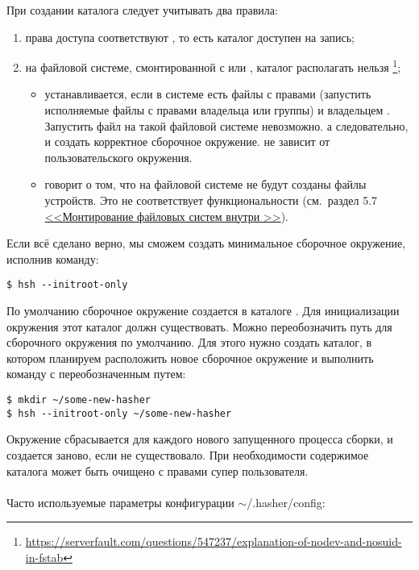 \begin{itemize}
При создании каталога  следует учитывать два правила:
\begin{enumerate}
	\item права доступа соответствуют , то есть каталог доступен на запись;
	\item на файловой системе, смонтированной с  или , каталог располагать нельзя%
\footnote{\href{https://serverfault.com/questions/547237/explanation-of-nodev-and-nosuid-in-fstab}{https://serverfault.com/questions/547237/explanation-of-nodev-and-nosuid-in-fstab}};
	\begin{itemize}
		\item {} устанавливается, если в системе есть файлы с правами 
			(запустить исполняемые файлы с правами владельца или группы) и владельцем .
			Запустить файл  на такой файловой системе невозможно. а следовательно,
			и создать корректное сборочное окружение.  не зависит от пользовательского окружения.
		\item {} говорит о том, что на файловой системе не будут созданы файлы устройств.
			Это не соответствует функциональности  (см.~раздел 5.7
			\hyperlink{mount_fs_hasher}{<<Монтирование файловых систем внутри >>}).
	\end{itemize}
\end{enumerate}
\end{itemize}
Если всё сделано верно, мы сможем создать минимальное сборочное окружение, исполнив команду:
\begin{verbatim}
$ hsh --initroot-only
\end{verbatim}
По умолчанию сборочное окружение создается в каталоге . Для инициализации окружения
этот каталог должн существовать. Можно переобозначить путь для сборочного окружения по умолчанию.
Для этого нужно создать каталог, в котором планируем расположить новое сборочное окружение и выполнить
команду с переобозначенным путем:
\begin{verbatim}
$ mkdir ~/some-new-hasher
$ hsh --initroot-only ~/some-new-hasher
\end{verbatim}
Окружение сбрасывается для каждого нового запущенного процесса сборки, и создается заново, если
не существовало. При необходимости содержимое каталога может быть очищено с правами
супер пользователя.\\
\\
Часто используемые параметры конфигурации $\sim$/.hasher/config:
